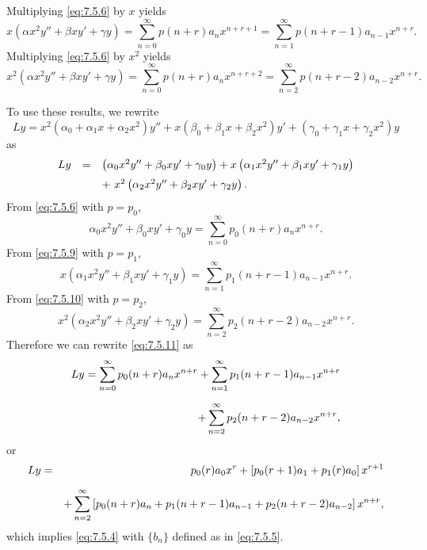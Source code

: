 Multiplying \eqref{eq:7.5.6} by $x$ yields
\begin{equation}
  \label{eq:7.5.9}x(\alpha x^{2}y''+\beta xy'+\gamma y)=\sum_{n=0}^{\infty}p(n+r)a_{n}x^{n+r+1}= \sum_{n=1}^{\infty}p(n+r-1)a_{n-1}x^{n+r}.
\end{equation}
Multiplying \eqref{eq:7.5.6} by $x^{2}$ yields
\begin{equation}
  \label{eq:7.5.10}x^{2}(\alpha x^{2}y''+\beta xy'+\gamma y)=\sum_{n=0}^{\infty}p(n+r)a_{n}x^{n+r+2}= \sum_{n=2}^{\infty}p(n+r-2)a_{n-2}x^{n+r}.
\end{equation}

To use these results, we rewrite
\[
  Ly= x^{2}(\alpha_{0}+\alpha_{1}x+\alpha_{2}x^{2})y''+x(\beta_{0}+\beta_{1}x+\beta_{2}x^{2})y' +(\gamma_{0}+\gamma_{1}x+\gamma_{2}x^{2})y
\]
as
\begin{equation}
  \label{eq:7.5.11}
  \begin{array}{ccl}
    Ly & = & \left(\alpha_{0}x^{2}y''+\beta_{0}xy' +\gamma_{0}y\right)+ x\left(\alpha_{1}x^{2}y''+\beta_{1}xy'+\gamma_{1}y\right) \\[2\jot]
       &   & +\
x^{2}\left(\alpha_{2}x^{2}y''+\beta_{2}xy'+\gamma_{2}y\right).
  \end{array}
\end{equation}
From \eqref{eq:7.5.6} with $p=p_{0}$,
\[
  \alpha_{0}x^{2}y''+\beta_{0}xy'+\gamma_{0}y=\sum_{n=0}^{\infty}p_{0}(n+r)a_{n}x^{n+r}.
\]
From \eqref{eq:7.5.9} with $p=p_{1}$,
\[
  x\left(\alpha_{1}x^{2}y''+\beta_{1}xy'+\gamma_{1}y\right)=\sum_{n=1}^{\infty}p_{1}(n+r-1)a_{n-1}x^{n+r}.
\]
From \eqref{eq:7.5.10} with $p=p_{2}$,
\[
  x^{2}\left(\alpha_{2}x^{2}y''+\beta_{2}xy'+\gamma_{2}y\right)=\sum_{n=2}^{\infty}p_{2}(n+r-2)a_{n-2}x^{n+r}.
\]
Therefore we can rewrite \eqref{eq:7.5.11} as
\begin{eqnarray*}
  Ly=\sum_{n=0}^{\infty}p_{0}(n+r)a_{n}x^{n+r}+\sum_{n=1}^{\infty}p_{1}(n+r-1)a_{n-1}x^{n+r} \\[2\jot]
  +\sum_{n=2}^{\infty}p_{2}(n+r-2)a_{n-2}x^{n+r},
\end{eqnarray*}
or
\begin{eqnarray*}
  Ly & = & p_{0}(r)a_{0}x^{r}+\left[p_{0}(r+1)a_{1}+p_{1}(r)a_{0}\right]x^{r+1} \\[2\jot]
     &   & +\sum_{n=2}^{\infty}\left[p_{0}(n+r)a_{n}+p_{1}(n+r-1)a_{n-1}+p_{2}(n+r-2)a_{n-2}\right]x^{n+r},
\end{eqnarray*}
which implies \eqref{eq:7.5.4} with $\{b_{n}\}$ defined as in \eqref{eq:7.5.5}.

